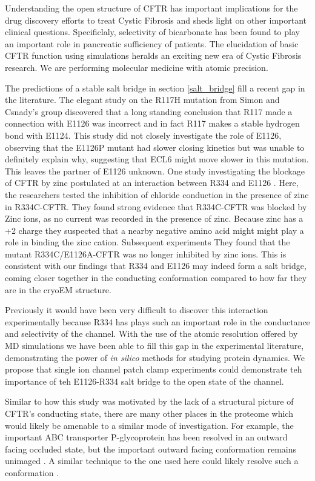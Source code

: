 Understanding the open structure of CFTR has important implications for the drug discovery efforts to treat Cystic Fibrosis and sheds light on other important clinical questions. Specificlaly, selectivity of bicarbonate has been found to play an important role in pancreatic sufficiency of patients. The elucidation of basic CFTR function using simulations heralds an exciting new era of Cystic Fibrosis research. We are performing molecular medicine with atomic precision. 

The predictions of a stable salt bridge in section \ref{salt_bridge} fill a recent gap in the literature. The elegant study on the R117H mutation from Simon and Csnady's group \cite{simon2021}  discovered that a long standing conclusion that R117 made a connection with E1126 was incorrect and in fact R117 makes a stable hydrogen bond with E1124. This study did not closely investigate the role of E1126, observing that the E1126P mutant had slower closing kinetics but was unable to definitely explain why, suggesting that ECL6 might move slower in this mutation. This leaves the partner of E1126 unknown. One study investigating the blockage of CFTR by zinc postulated at an interaction between R334 and E1126 \cite{wang2016}. Here, the researchers tested the inhibition of chloride conduction in the presence of zinc in R334C-CFTR. They found strong evidence that R334C-CFTR was blocked by Zinc ions, as no current was recorded in the presence of zinc. Because zinc has a +2 charge they suspected that a nearby negative amino acid might might play a role in binding the zinc cation. Subsequent experiments They found that the mutant R334C/E1126A-CFTR was no longer inhibited by zinc ions. This is consistent with our findings that R334 and E1126 may indeed form a salt bridge, coming closer together in the conducting conformation compared to how far they are in the cryoEM structure.  

Previously it would have been very difficult to discover this interaction experimentally because R334 has plays such an important role in the conductance and selectivity of the channel. With the use of the atomic resolution offered by MD simulations we have been able to fill this gap in the experimental literature, demonstrating the power of \textit {in silico} methods for studying protein dynamics. We propose that single ion channel patch clamp experiments could demonstrate teh importance of teh E1126-R334 salt bridge to the open state of the channel. 

Similar to how this study was motivated by the lack of a structural picture of CFTR's conducting state, there are many other places in the proteome which would likely be amenable to a similar mode of investigation. For example, the important ABC transporter P-glycoprotein has been resolved in an outward facing occluded state, but the important outward facing conformation remains unimaged \cite{}. A similar technique to the one used here could likely resolve such a conformation \cite{kim2018a}.

